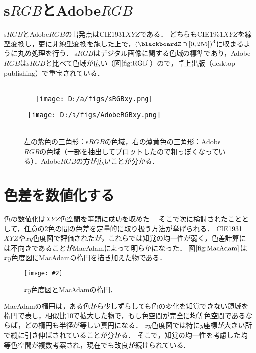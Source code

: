 \documentclass[uplatex,paper=a4,fontsize=4.0truemm,jafontsize=4.0truemm,head_space=30.0truemm,foot_space=30.0truemm,baselineskip=8.0truemm,line_length=40zw,gutter=25.0truemm,oneside,openany,fleqn,hanging_panctuation,open_bracket_pos=nibu_tentsuki,dvipdfmx,jis2004,book,titlepage]{jlreq}
\theoremstyle{mystyle}
\newcommand{\captiondot}[1]{\caption{#1．}}
\newcommand{\figureinput}[4]{\begin{figure}[btp]\centering\texttt{[image: \#2]}\captiondot{#3}\label{fig:#4}\end{figure}}
\newcommand{\mathdisplaystyle}[1]{\(\displaystyle{#1}\)}
\newcommand{\Reference}[1]{\mathdisplaystyle{\ref{#1}}}
\newcommand{\parentheses}[1]{\left(#1\right)}
\newcommand{\squarebrackets}[1]{\left[#1\right]}
\begin{document}
		\section{s\mathdisplaystyle{RGB}とAdobe\mathdisplaystyle{RGB}}
			s\mathdisplaystyle{RGB}とAdobe\mathdisplaystyle{RGB}の出発点はCIE1931\mathdisplaystyle{XYZ}である．
			どちらもCIE1931\mathdisplaystyle{XYZ}を線型変換し，更に非線型変換を施した上で，\mathdisplaystyle{\parentheses{\blackboardZ\cap\squarebrackets{0,255}}^3}に収まるように丸め処理を行う．
			s\mathdisplaystyle{RGB}はデジタル画像に関する色域の標準であり，Adobe\mathdisplaystyle{RGB}はs\mathdisplaystyle{RGB}と比べて色域が広い（図\Reference{fig:RGB}）ので，卓上出版（desktop publishing）で重宝されている．
			\begin{figure}[tbp]
				\centering
				\begin{tabular}{c}
					\begin{minipage}{0.5\linewidth}
						\centering
						\texttt{[image: D:/a/figs/sRGBxy.png]}
					\end{minipage}
					\begin{minipage}{0.5\linewidth}
						\centering
						\texttt{[image: D:/a/figs/AdobeRGBxy.png]}
					\end{minipage}
				\end{tabular}
				\captiondot{左の紫色の三角形：s\mathdisplaystyle{RGB}の色域，右の薄黄色の三角形：Adobe\mathdisplaystyle{RGB}の色域（一部を抽出してプロットしたので粗っぽくなっている）．Adobe\mathdisplaystyle{RGB}の方が広いことが分かる}\label{fig:RGB}
			\end{figure}
		\section{色差を数値化する}
			色の数値化は\mathdisplaystyle{XYZ}色空間を筆頭に成功を収めた．
			そこで次に検討されたこととして，任意の2色の間の色差を定量的に取り扱う方法が挙げられる．
			CIE1931\mathdisplaystyle{XYZ}や\mathdisplaystyle{xy}色度図で評価されたが，これらでは知覚の均一性が弱く，色差計算には不向きであることがMacAdamによって明らかになった\cite{MacAdam1942}．
			図\Reference{fig:MacAdam}は\mathdisplaystyle{xy}色度図にMacAdamの楕円を描き加えた物である．
			\figureinput{width=\linewidth}{D:/a/figs/MacAdam.png}{\mathdisplaystyle{xy}色度図とMacAdamの楕円}{MacAdam}
			MacAdamの楕円は，ある色から少しずらしても色の変化を知覚できない領域を楕円で表し，相似比10で拡大した物で，もし色空間が完全に均等色空間であるならば，どの楕円も半径が等しい真円になる．
			\mathdisplaystyle{xy}色度図では特に\mathdisplaystyle{y}座標が大きい所で縦に引き伸ばされていることが分かる．
			そこで，知覚の均一性を考慮した均等色空間が複数考案され，現在でも改良が続けられている．
\end{document}
